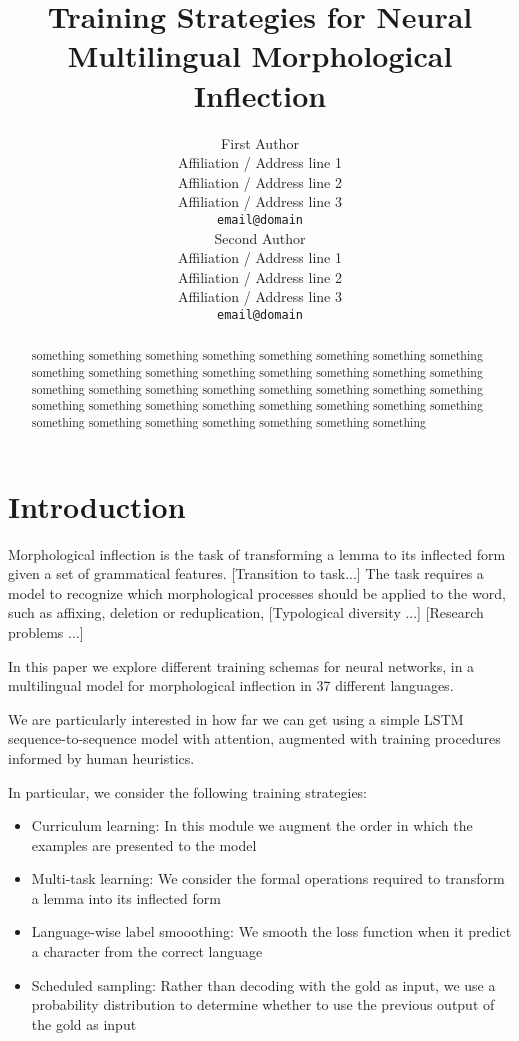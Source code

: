 \documentclass[11pt,a4paper]{article}
\title{Training Strategies for Neural Multilingual Morphological Inflection}
\author{First Author \\
  Affiliation / Address line 1 \\
  Affiliation / Address line 2 \\
  Affiliation / Address line 3 \\
  \texttt{email@domain} \\\And
  Second Author \\
  Affiliation / Address line 1 \\
  Affiliation / Address line 2 \\
  Affiliation / Address line 3 \\
  \texttt{email@domain} \\}
\date{}
\begin{document}
\maketitle
\begin{abstract}
something something something something something something
something something something something something something
something something something something something something
something something something something something something
something something something something something something
something something something something something something
something something something 
\end{abstract}

\section{Introduction}

Morphological inflection is the task of transforming a lemma to its
inflected form given a set of grammatical features. 
[Transition to task...]
The task requires a model to recognize which morphological processes
should be applied to the word, such as affixing, deletion or
reduplication, 
[Typological diversity ...]
[Research problems ...]

In this paper we explore different training schemas for neural
networks, in a multilingual model for morphological inflection in 37
different languages.

We are particularly interested in how far we can get using a simple
LSTM sequence-to-sequence model with attention, augmented with
training procedures informed by human heuristics.

In particular, we consider the following training strategies:

\begin{itemize}
\item Curriculum learning: In this module we augment the order in which the examples are presented to the model
\item Multi-task learning: We consider the formal operations required to transform a lemma into its inflected form
\item Language-wise label smooothing: We smooth the loss function when it predict a character from the correct language
\item Scheduled sampling: Rather than decoding with the gold as input, we use a probability distribution to determine whether to use the previous output of the gold as input
\end{itemize}
\end{document}
